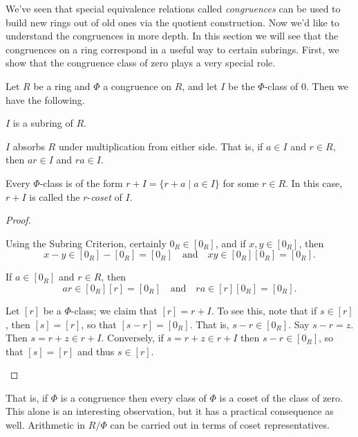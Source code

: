 We've seen that special equivalence relations called \emph{congruences} can be used to build new rings out of old ones via the quotient construction.
Now we'd like to understand the congruences in more depth.
In this section we will see that the congruences on a ring correspond in a useful way to certain subrings.
First, we show that the congruence class of zero plays a very special role.

\begin{prop}
Let \(R\) be a ring and \(\Phi\) a congruence on \(R\), and let \(I\) be the \(\Phi\)-class of 0.
Then we have the following.
\begin{proplist}
\item \(I\) is a subring of \(R\).
\item \(I\) absorbs \(R\) under multiplication from either side.
That is, if \(a \in I\) and \(r \in R\), then \(ar \in I\) and \(ra \in I\).
\item Every \(\Phi\)-class is of the form \(r + I = \{ r+a \mid a \in I \}\) for some \(r \in R\).
In this case, \(r+I\) is called the \(r\)-\emph{coset} of \(I\).
\end{proplist}
\end{prop}

\begin{proof}
\begin{inlineproplist}
\item Using the Subring Criterion, certainly \(0_R \in [0_R]\), and if \(x,y \in [0_R]\), then \[ x-y \in [0_R] - [0_R] = [0_R] \quad \mathrm{and} \quad xy \in [0_R][0_R] = [0_R]. \]
\item If \(a \in [0_R]\) and \(r \in R\), then \[ ar \in [0_R][r] = [0_R] \quad \mathrm{and} \quad ra \in [r][0_R] = [0_R]. \]
\item Let \([r]\) be a \(\Phi\)-class; we claim that \([r] = r + I\).
To see this, note that if \(s \in [r]\), then \([s] = [r]\), so that \([s-r] = [0_R]\).
That is, \(s-r \in [0_R]\).
Say \(s-r = z\).
Then \(s = r+z \in r+I\).
Conversely, if \(s = r+z \in r+I\) then \(s-r \in [0_R]\), so that \([s] = [r]\) and thus \(s \in [r]\).
\qedhere
\end{inlineproplist}
\end{proof}

That is, if \(\Phi\) is a congruence then every class of \(\Phi\) is a coset of the class of zero.
This alone is an interesting observation, but it has a practical consequence as well.
Arithmetic in \(R/\Phi\) can be carried out in terms of coset representatives.

